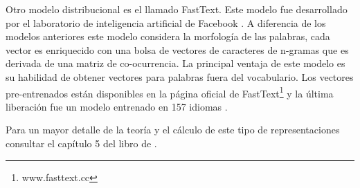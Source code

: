 Otro modelo distribucional es el llamado FastText. Este modelo fue desarrollado por el laboratorio de inteligencia artificial de Facebook \citep{mikolov2017advances}. A diferencia de los modelos anteriores este modelo considera la morfología de las palabras, cada vector es enriquecido con una bolsa de vectores de caracteres de n-gramas que es derivada de una matriz de co-ocurrencia. La  principal ventaja de este modelo es su habilidad de obtener vectores para palabras fuera del vocabulario. Los vectores pre-entrenados están disponibles en la página oficial de FastText\footnote{www.fasttext.cc}  y la última liberación fue un modelo entrenado en 157 idiomas \citep{grave2018learning}.

Para un mayor detalle de la teoría y el cálculo de este tipo de representaciones consultar el capítulo 5 del libro de \citep{kamath2019deep}.

